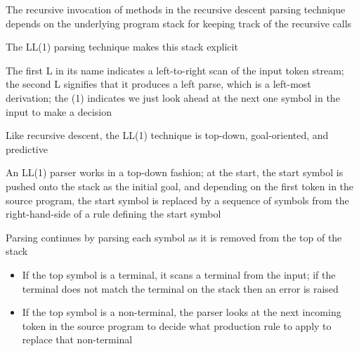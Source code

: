 \documentclass[8pt,a4paper,compress]{beamer}
\begin{document}
\begin{frame}[fragile]
\pause

The recursive invocation of methods in the recursive descent parsing technique depends on the underlying program stack for keeping track of the recursive calls

\pause
\bigskip

The LL(1) parsing technique makes this stack explicit

\pause
\bigskip

The first L in its name indicates a left-to-right scan of the input token stream; the second L signifies that it produces a left parse, which is a left-most derivation; the (1) indicates we just look ahead at the next one symbol in the input to make a decision

\pause
\bigskip

Like recursive descent, the LL(1) technique is top-down, goal-oriented, and predictive

\pause
\bigskip

An LL(1) parser works in a top-down fashion; at the start, the start symbol is pushed onto the stack as the initial goal, and depending on the first token in the source program, the start symbol is replaced by a sequence of symbols from the right-hand-side of a rule defining the start symbol

\pause
\bigskip

Parsing continues by parsing each symbol as it is removed from the top of the stack
\begin{itemize}
\item If the top symbol is a terminal, it scans a terminal from the input; if the terminal does not match the terminal on the stack then an error is raised
\item If the top symbol is a non-terminal, the parser looks at the next incoming token in the source program to decide what production rule to apply to replace that non-terminal
\end{itemize}
\end{frame}
\end{document}
